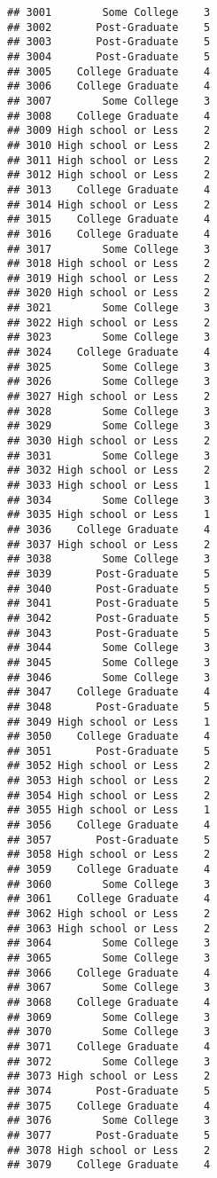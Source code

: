 \documentclass[
]{article}
\begin{document}
\begin{verbatim}
## 3001        Some College    3
## 3002       Post-Graduate    5
## 3003       Post-Graduate    5
## 3004       Post-Graduate    5
## 3005    College Graduate    4
## 3006    College Graduate    4
## 3007        Some College    3
## 3008    College Graduate    4
## 3009 High school or Less    2
## 3010 High school or Less    2
## 3011 High school or Less    2
## 3012 High school or Less    2
## 3013    College Graduate    4
## 3014 High school or Less    2
## 3015    College Graduate    4
## 3016    College Graduate    4
## 3017        Some College    3
## 3018 High school or Less    2
## 3019 High school or Less    2
## 3020 High school or Less    2
## 3021        Some College    3
## 3022 High school or Less    2
## 3023        Some College    3
## 3024    College Graduate    4
## 3025        Some College    3
## 3026        Some College    3
## 3027 High school or Less    2
## 3028        Some College    3
## 3029        Some College    3
## 3030 High school or Less    2
## 3031        Some College    3
## 3032 High school or Less    2
## 3033 High school or Less    1
## 3034        Some College    3
## 3035 High school or Less    1
## 3036    College Graduate    4
## 3037 High school or Less    2
## 3038        Some College    3
## 3039       Post-Graduate    5
## 3040       Post-Graduate    5
## 3041       Post-Graduate    5
## 3042       Post-Graduate    5
## 3043       Post-Graduate    5
## 3044        Some College    3
## 3045        Some College    3
## 3046        Some College    3
## 3047    College Graduate    4
## 3048       Post-Graduate    5
## 3049 High school or Less    1
## 3050    College Graduate    4
## 3051       Post-Graduate    5
## 3052 High school or Less    2
## 3053 High school or Less    2
## 3054 High school or Less    2
## 3055 High school or Less    1
## 3056    College Graduate    4
## 3057       Post-Graduate    5
## 3058 High school or Less    2
## 3059    College Graduate    4
## 3060        Some College    3
## 3061    College Graduate    4
## 3062 High school or Less    2
## 3063 High school or Less    2
## 3064        Some College    3
## 3065        Some College    3
## 3066    College Graduate    4
## 3067        Some College    3
## 3068    College Graduate    4
## 3069        Some College    3
## 3070        Some College    3
## 3071    College Graduate    4
## 3072        Some College    3
## 3073 High school or Less    2
## 3074       Post-Graduate    5
## 3075    College Graduate    4
## 3076        Some College    3
## 3077       Post-Graduate    5
## 3078 High school or Less    2
## 3079    College Graduate    4

\end{verbatim}
\end{document}
